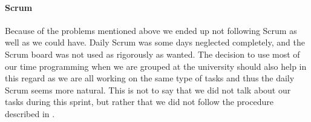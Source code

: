 \paragraph{Scrum}
Because of the problems mentioned above we ended up not following Scrum as well as we could have.
Daily Scrum was some days neglected completely, and the Scrum board was not used as rigorously as wanted.
The decision to use most of our time programming when we are grouped at the university should also help in this regard as we are all working on the same type of tasks and thus the daily Scrum seems more natural.
This is not to say that we did not talk about our tasks during this sprint, but rather that we did not follow the procedure described in .
